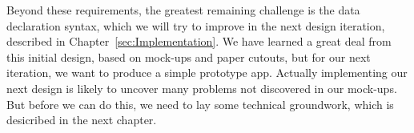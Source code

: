 Beyond these requirements, the greatest remaining challenge is the data declaration syntax, which we will try to improve in the next design iteration, described in Chapter~\ref{sec:Implementation}.
We have learned a great deal from this initial design, based on mock-ups and paper cutouts, but for our next iteration, we want to produce a simple prototype app.
Actually implementing our next design is likely to uncover many problems not discovered in our mock-ups.
But before we can do this, we need to lay some technical groundwork, which is desicribed in the next chapter.